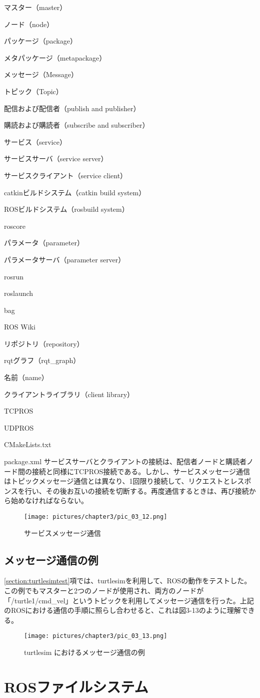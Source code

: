 \begin{term}{マスター（master）}
\begin{term}{ノード（node）}
\begin{term}{パッケージ（package）}
\begin{term}{メタパッケージ（metapackage）}
\begin{term}{メッセージ（Message）}
\begin{term}{トピック（Topic）}
\begin{term}{配信および配信者（publish and publisher）}
\begin{term}{購読および購読者（subscribe and subscriber）}
\begin{term}{サービス（service）}
\begin{term}{サービスサーバ（service server）}
\begin{term}{サービスクライアント（service client）}
\begin{term}{catkinビルドシステム（catkin build system）}
\begin{term}{ROSビルドシステム（rosbuild system）}
\begin{term}{roscore}
\begin{term}{パラメータ（parameter）}
\begin{term}{パラメータサーバ（parameter server）}
\begin{term}{rosrun}
\begin{term}{roslaunch}
\begin{term}{bag}
\begin{term}{ROS Wiki}
\begin{term}{リポジトリ（repository）}
\begin{term}{rqtグラフ（rqt\_graph）}
\begin{term}{名前（name）}
\begin{term}{クライアントライブラリ（client library）}
\begin{term}{TCPROS}
\begin{term}{UDPROS}
\begin{term}{CMakeLists.txt}
\begin{term}{package.xml}
サービスサーバとクライアントの接続は、配信者ノードと購読者ノード間の接続と同様にTCPROS接続である。しかし、サービスメッセージ通信はトピックメッセージ通信とは異なり、1回限り接続して、リクエストとレスポンスを行い、その後お互いの接続を切断する。再度通信するときは、再び接続から始めなければならない。

\begin{figure}[h]
  \centering
  \texttt{[image: pictures/chapter3/pic\_03\_12.png]}
  \caption{サービスメッセージ通信}
\end{figure}

\subsection{メッセージ通信の例}

\ref{section:turtlesimtest}項では、turtlesimを利用して、ROSの動作をテストした。この例でもマスターと2つのノードが使用され、両方のノードが「/turtle1/cmd\_vel」というトピックを利用してメッセージ通信を行った。上記のROSにおける通信の手順に照らし合わせると、これは図3-13のように理解できる。

\begin{figure}[h]
  \centering
  \texttt{[image: pictures/chapter3/pic\_03\_13.png]}
  \caption{turtlesim におけるメッセージ通信の例}
\end{figure}

\section{ROSファイルシステム}


\end{term}
\end{term}
\end{term}
\end{term}
\end{term}
\end{term}
\end{term}
\end{term}
\end{term}
\end{term}
\end{term}
\end{term}
\end{term}
\end{term}
\end{term}
\end{term}
\end{term}
\end{term}
\end{term}
\end{term}
\end{term}
\end{term}
\end{term}
\end{term}
\end{term}
\end{term}
\end{term}
\end{term}
